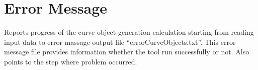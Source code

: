 \section{Error Message}\label{error-message}

Reports progress of the curve object generation calculation starting from reading input data to error massage output file ``errorCurveObjects.txt''. This error message file provides information whether the tool run successfully or not. Also points to the step where problem occurred.
